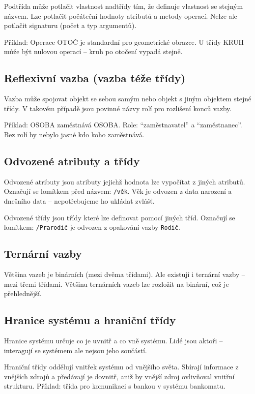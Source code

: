 \documentclass[12pt, a4paper]{article}
\begin{document}
Podtřída může potlačit vlastnost nadtřídy tím, že definuje vlastnost se stejným názvem. Lze potlačit počáteční hodnoty atributů a metody operací. Nelze ale potlačit signaturu (počet a typ argumentů).

Příklad: Operace OTOČ je standardní pro geometrické obrazce. U třídy KRUH může být nulovou operací -- kruh po otočení vypadá stejně.

\subsection{Reflexivní vazba (vazba téže třídy)}

Vazba může spojovat objekt se sebou samým nebo objekt s jiným objektem stejné třídy. V takovém případě jsou povinné názvy rolí pro rozlišení konců vazby.

Příklad: OSOBA zaměstnává OSOBA. Role: ``zaměstnavatel'' a ``zaměstnanec''. Bez rolí by nebylo jasné kdo koho zaměstnává.

\subsection{Odvozené atributy a třídy}

Odvozené atributy jsou atributy jejichž hodnota lze vypočítat z jiných atributů. Označují se lomítkem před názvem: \texttt{/věk}. Věk je odvozen z data narození a dnešního data -- nepotřebujeme ho ukládat zvlášť.

Odvozené třídy jsou třídy které lze definovat pomocí jiných tříd. Označují se lomítkem: \texttt{/Prarodič} je odvozen z opakování vazby \texttt{Rodič}.

\subsection{Ternární vazby}

Většina vazeb je binárních (mezi dvěma třídami). Ale existují i ternární vazby -- mezi třemi třídami. Většinu ternárních vazeb lze rozložit na binární, což je přehlednější.

\subsection{Hranice systému a hraniční třídy}

Hranice systému určuje co je uvnitř a co vně systému. Lidé jsou aktoři -- interagují se systémem ale nejsou jeho součástí.

Hraniční třídy oddělují vnitřek systému od vnějšího světa. Sbírají informace z vnějších zdrojů a předávají je dovnitř, aniž by vnější zdroj ovlivňoval vnitřní strukturu. Příklad: třída pro komunikaci s bankou v systému bankomatu.
\end{document}
